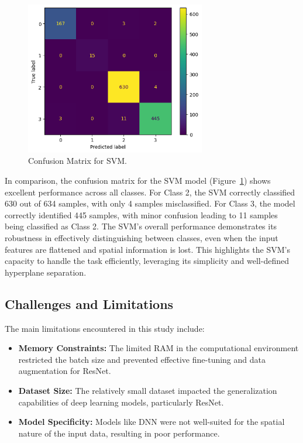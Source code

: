 \documentclass[runningheads]{llncs}
\begin{document}
\begin{figure}[htbp]
    \centering
    \includegraphics[width=0.7\textwidth]{svm_confusion_matrix.png}
    \caption{Confusion Matrix for SVM.}
    \label{fig:svm_confusion}
\end{figure}

In comparison, the confusion matrix for the SVM model  (Figure~\ref{fig:svm_confusion}) shows excellent performance across all classes. For Class 2, the SVM correctly classified 630 out of 634 samples, with only 4 samples misclassified. For Class 3, the model correctly identified 445 samples, with minor confusion leading to 11 samples being classified as Class 2. The SVM's overall performance demonstrates its robustness in effectively distinguishing between classes, even when the input features are flattened and spatial information is lost. This highlights the SVM's capacity to handle the task efficiently, leveraging its simplicity and well-defined hyperplane separation.

\subsection{Challenges and Limitations}

The main limitations encountered in this study include:

\begin{itemize}
    \item \textbf{Memory Constraints:} The limited RAM in the computational environment restricted the batch size and prevented effective fine-tuning and data augmentation for ResNet.
    \item \textbf{Dataset Size:} The relatively small dataset impacted the generalization capabilities of deep learning models, particularly ResNet.
    \item \textbf{Model Specificity:} Models like DNN were not well-suited for the spatial nature of the input data, resulting in poor performance.
\end{itemize}
\end{document}
